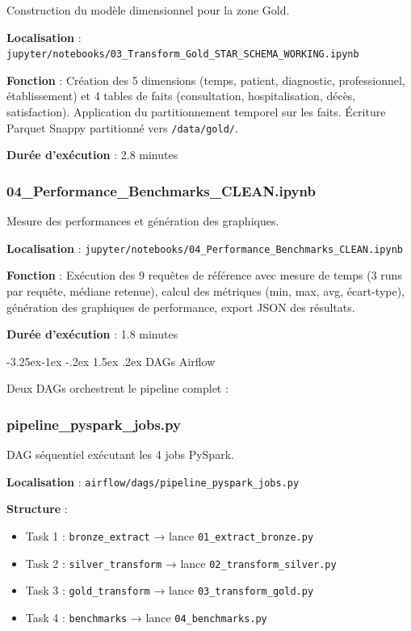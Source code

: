 \documentclass[12pt,a4paper]{article}
\makeatletter
\renewcommand\subsection{\@startsection{subsection}{2}{\z@}%
    {-3.25ex\@plus -1ex \@minus -.2ex}%
    {1.5ex \@plus .2ex}%
    {\normalfont\large\bfseries\color{blue!50!black}}}
\makeatother
\begin{document}
Construction du modèle dimensionnel pour la zone Gold.

\textbf{Localisation} : \texttt{jupyter/notebooks/03\_Transform\_Gold\_STAR\_SCHEMA\_WORKING.ipynb}

\textbf{Fonction} : Création des 5 dimensions (temps, patient, diagnostic, professionnel, établissement) et 4 tables de faits (consultation, hospitalisation, décès, satisfaction). Application du partitionnement temporel sur les faits. Écriture Parquet Snappy partitionné vers \texttt{/data/gold/}.

\textbf{Durée d'exécution} : 2.8 minutes

\subsubsection{04\_Performance\_Benchmarks\_CLEAN.ipynb}

Mesure des performances et génération des graphiques.

\textbf{Localisation} : \texttt{jupyter/notebooks/04\_Performance\_Benchmarks\_CLEAN.ipynb}

\textbf{Fonction} : Exécution des 9 requêtes de référence avec mesure de temps (3 runs par requête, médiane retenue), calcul des métriques (min, max, avg, écart-type), génération des graphiques de performance, export JSON des résultats.

\textbf{Durée d'exécution} : 1.8 minutes

\subsection{DAGs Airflow}

Deux DAGs orchestrent le pipeline complet :

\subsubsection{pipeline\_pyspark\_jobs.py}

DAG séquentiel exécutant les 4 jobs PySpark.

\textbf{Localisation} : \texttt{airflow/dags/pipeline\_pyspark\_jobs.py}

\textbf{Structure} :
\begin{itemize}
\item Task 1 : \texttt{bronze\_extract} → lance \texttt{01\_extract\_bronze.py}
\item Task 2 : \texttt{silver\_transform} → lance \texttt{02\_transform\_silver.py}
\item Task 3 : \texttt{gold\_transform} → lance \texttt{03\_transform\_gold.py}
\item Task 4 : \texttt{benchmarks} → lance \texttt{04\_benchmarks.py}
\end{itemize}
\end{document}
